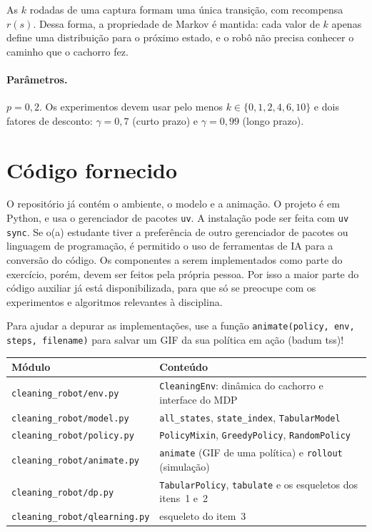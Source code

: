 \documentclass[11pt,a4paper]{article}
\newcommand{\code}[1]{\texttt{#1}}
\begin{document}
As $k$ rodadas de uma captura formam uma única transição, com recompensa $r(s)$. Dessa forma, a
propriedade de Markov é mantida: cada valor de $k$ apenas define uma distribuição para o próximo
estado, e o robô não precisa conhecer o caminho que o cachorro fez.

\paragraph{Parâmetros.} $p = 0{,}2$. Os experimentos devem usar pelo menos
$k \in \{0, 1, 2, 4, 6, 10\}$ e dois fatores de desconto: $\gamma = 0{,}7$ (curto prazo) e
$\gamma = 0{,}99$ (longo prazo).

\section{Código fornecido}

O repositório já contém o ambiente, o modelo e a animação. O projeto é em Python, e usa o
gerenciador de pacotes \code{uv}. A instalação pode ser feita com \code{uv sync}. Se o(a)
estudante tiver a preferência de outro gerenciador de pacotes ou linguagem de programação, é
permitido o uso de ferramentas de IA para a conversão do código. Os componentes a serem
implementados como parte do exercício, porém, devem ser feitos pela própria pessoa. Por isso a
maior parte do código auxiliar já está disponibilizada, para que só se preocupe com os experimentos
e algoritmos relevantes à disciplina.

Para ajudar a depurar as implementações, use a função \code{animate(policy, env, steps, filename)}
para salvar um GIF da sua política em ação (badum tss)!

\begin{center}
\begin{tabular}{@{}ll@{}}
  \toprule
  Módulo & Conteúdo \\
  \midrule
  \code{cleaning\_robot/env.py} & \code{CleaningEnv}: dinâmica do cachorro e interface do MDP \\
  \code{cleaning\_robot/model.py} & \code{all\_states}, \code{state\_index}, \code{TabularModel} \\
  \code{cleaning\_robot/policy.py} & \code{PolicyMixin}, \code{GreedyPolicy}, \code{RandomPolicy} \\
  \code{cleaning\_robot/animate.py} & \code{animate} (GIF de uma política) e \code{rollout} (simulação) \\
  \code{cleaning\_robot/dp.py} & \code{TabularPolicy}, \code{tabulate} e os esqueletos dos itens~1 e~2 \\
  \code{cleaning\_robot/qlearning.py} & esqueleto do item~3 \\
  \bottomrule
\end{tabular}
\end{center}
\end{document}
